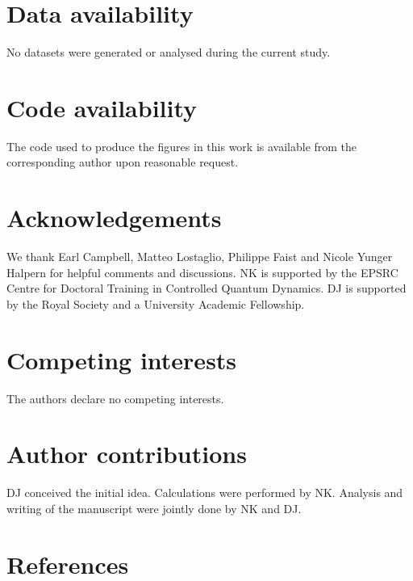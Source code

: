 \documentclass[
onecolumn,
superscriptaddress
]{revtex4-1}
\begin{document}
\section*{Data availability}
No datasets were generated or analysed during the current study.

\section*{Code availability}
The code used to produce the figures in this work is available from the corresponding author upon reasonable request.

\section*{Acknowledgements}
We thank Earl Campbell, Matteo Lostaglio, Philippe Faist and Nicole Yunger Halpern for helpful comments and discussions. NK is supported by the EPSRC Centre for Doctoral Training in Controlled Quantum Dynamics. DJ is supported by the Royal Society and a University Academic Fellowship.

\section*{Competing interests}
The authors declare no competing interests.

\section*{Author contributions}
DJ conceived the initial idea. 
Calculations were performed by NK. 
Analysis and writing of the manuscript were jointly done by NK and DJ.

\section*{References}
\end{document}
